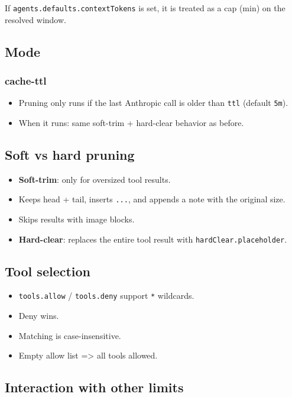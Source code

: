 If \texttt{agents.defaults.contextTokens} is set, it is treated as a cap (min) on the resolved window.

\subsection{Mode}


\subsubsection{cache-ttl}


\begin{itemize}
  \item Pruning only runs if the last Anthropic call is older than \texttt{ttl} (default \texttt{5m}).
  \item When it runs: same soft-trim + hard-clear behavior as before.
\end{itemize}


\subsection{Soft vs hard pruning}


\begin{itemize}
  \item \textbf{Soft-trim}: only for oversized tool results.
  \item Keeps head + tail, inserts \texttt{...}, and appends a note with the original size.
  \item Skips results with image blocks.
  \item \textbf{Hard-clear}: replaces the entire tool result with \texttt{hardClear.placeholder}.
\end{itemize}


\subsection{Tool selection}


\begin{itemize}
  \item \texttt{tools.allow} / \texttt{tools.deny} support \texttt{*} wildcards.
  \item Deny wins.
  \item Matching is case-insensitive.
  \item Empty allow list => all tools allowed.
\end{itemize}


\subsection{Interaction with other limits}


